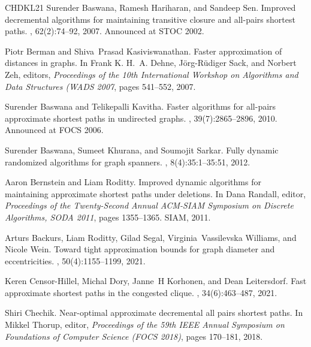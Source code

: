 \documentclass[11pt]{article}
\theoremstyle{definition}
\theoremstyle{remark}
\begin{document}
\begin{thebibliography}{CHDKL21}
Surender Baswana, Ramesh Hariharan, and Sandeep Sen.
\newblock Improved decremental algorithms for maintaining transitive closure
  and all-pairs shortest paths.
, 62(2):74--92, 2007.
\newblock Announced at {STOC} 2002.

Piotr Berman and Shiva~Prasad Kasiviswanathan.
\newblock Faster approximation of distances in graphs.
\newblock In Frank K. H.~A. Dehne, J{\"{o}}rg{-}R{\"{u}}diger Sack, and Norbert
  Zeh, editors, {\em Proceedings of the 10th International Workshop on
  Algorithms and Data Structures ({WADS} 2007}, pages 541--552, 2007.

Surender Baswana and Telikepalli Kavitha.
\newblock Faster algorithms for all-pairs approximate shortest paths in
  undirected graphs.
, 39(7):2865--2896, 2010.
\newblock Announced at {FOCS} 2006.

Surender Baswana, Sumeet Khurana, and Soumojit Sarkar.
\newblock Fully dynamic randomized algorithms for graph spanners.
, 8(4):35:1--35:51, 2012.

Aaron Bernstein and Liam Roditty.
\newblock Improved dynamic algorithms for maintaining approximate shortest
  paths under deletions.
\newblock In Dana Randall, editor, {\em Proceedings of the Twenty-Second Annual
  {ACM-SIAM} Symposium on Discrete Algorithms, {SODA} 2011}, pages 1355--1365.
  {SIAM}, 2011.

Arturs Backurs, Liam Roditty, Gilad Segal, Virginia~Vassilevska Williams, and
  Nicole Wein.
\newblock Toward tight approximation bounds for graph diameter and
  eccentricities.
, 50(4):1155--1199, 2021.

Keren Censor-Hillel, Michal Dory, Janne~H Korhonen, and Dean Leitersdorf.
\newblock Fast approximate shortest paths in the congested clique.
, 34(6):463--487, 2021.

Shiri Chechik.
\newblock Near-optimal approximate decremental all pairs shortest paths.
\newblock In Mikkel Thorup, editor, {\em Proceedings of the 59th {IEEE} Annual
  Symposium on Foundations of Computer Science ({FOCS} 2018)}, pages 170--181,
  2018.


\end{thebibliography}
\end{document}
